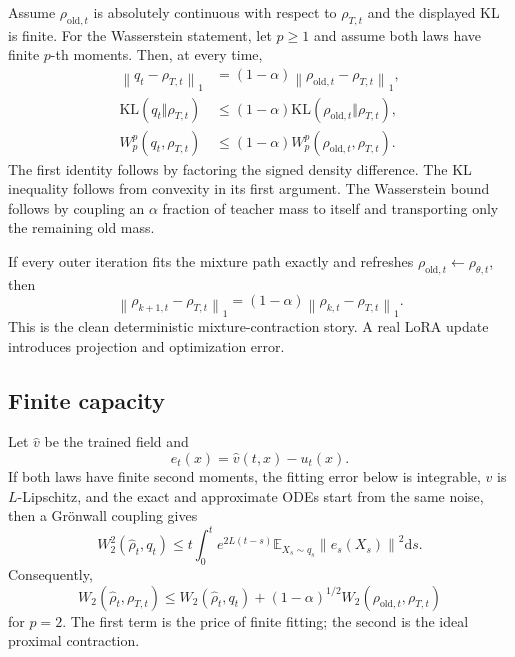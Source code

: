 \documentclass[11pt,a4paper]{article}
\newcommand{\E}{\mathbb{E}}
\newcommand{\KL}{\mathrm{KL}}
\newcommand{\norm}[1]{\left\lVert #1 \right\rVert}
\newcommand{\dd}{\mathrm{d}}
\theoremstyle{plain}
\theoremstyle{definition}
\begin{document}
Assume $\rho_{\mathrm{old},t}$ is absolutely continuous with respect to $\rho_{T,t}$ and the
displayed KL is finite.  For the Wasserstein statement, let $p\ge1$ and assume both laws have
finite $p$-th moments.  Then, at every time,
\begin{align}
\norm{q_t-\rho_{T,t}}_1
&=
(1-\alpha)
\norm{\rho_{\mathrm{old},t}-\rho_{T,t}}_1,
\label{eq:l1-contraction}\\
\KL(q_t\Vert\rho_{T,t})
&\le
(1-\alpha)\KL(\rho_{\mathrm{old},t}\Vert\rho_{T,t}),
\label{eq:kl-contraction}\\
W_p^p(q_t,\rho_{T,t})
&\le
(1-\alpha)W_p^p(\rho_{\mathrm{old},t},\rho_{T,t}).
\label{eq:wasserstein-contraction}
\end{align}
The first identity follows by factoring the signed density difference.  The KL inequality follows
from convexity in its first argument.  The Wasserstein bound follows by coupling an
$\alpha$ fraction of teacher mass to itself and transporting only the remaining old mass.

If every outer iteration fits the mixture path exactly and refreshes
$\rho_{\mathrm{old},t}\leftarrow\rho_{\theta,t}$, then
\begin{equation}
\norm{\rho_{k+1,t}-\rho_{T,t}}_1
=(1-\alpha)
\norm{\rho_{k,t}-\rho_{T,t}}_1.
\label{eq:iterative-contraction}
\end{equation}
This is the clean deterministic mixture-contraction story.  A real LoRA update introduces
projection and optimization error.

\subsection{Finite capacity}

Let $\widehat v$ be the trained field and
\begin{equation}
e_t(x)=\widehat v(t,x)-u_t(x).
\end{equation}
If both laws have finite second moments, the fitting error below is integrable,
$\widehat v$ is $L$-Lipschitz, and the exact and approximate ODEs start from the same noise, then
a Gr\"onwall coupling gives
\begin{equation}
W_2^2(\widehat\rho_t,q_t)
\le
t\int_0^t
e^{2L(t-s)}
\E_{X_s\sim q_s}\norm{e_s(X_s)}^2\dd s.
\label{eq:capacity-bound}
\end{equation}
Consequently,
\begin{equation}
W_2(\widehat\rho_t,\rho_{T,t})
\le
W_2(\widehat\rho_t,q_t)
+
(1-\alpha)^{1/2}
W_2(\rho_{\mathrm{old},t},\rho_{T,t})
\label{eq:practical-bound}
\end{equation}
for $p=2$.  The first term is the price of finite fitting; the second is the ideal proximal
contraction.
\end{document}
